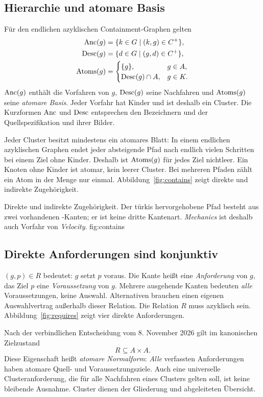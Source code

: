 \subsection{Hierarchie und atomare Basis}
Für den endlichen azyklischen Containment-Graphen gelten
\begin{align}
 \operatorname{Anc}(g)&=\{k\in G\mid(k,g)\in C^+\},\\
 \operatorname{Desc}(g)&=\{d\in G\mid(g,d)\in C^+\},\\
 \operatorname{Atoms}(g)&=\begin{cases}\{g\},&g\in A,\\\operatorname{Desc}(g)\cap A,&g\in K.\end{cases}
\end{align}
$\operatorname{Anc}(g)$ enthält die Vorfahren von $g$, $\operatorname{Desc}(g)$ seine Nachfahren und
$\operatorname{Atoms}(g)$ seine \emph{atomare Basis}. Jeder Vorfahr hat Kinder und ist
deshalb ein Cluster. Die Kurzformen $\operatorname{Anc}$ und $\operatorname{Desc}$ entsprechen den
Bezeichnern  und  der Quellspezifikation
und ihrer Bilder.

Jeder Cluster besitzt mindestens ein atomares Blatt: In einem endlichen
azyklischen Graphen endet jeder absteigende Pfad nach endlich vielen
Schritten bei einem Ziel ohne Kinder. Deshalb ist
$\operatorname{Atoms}(g)$ für jedes Ziel nichtleer. Ein Knoten ohne Kinder ist atomar,
kein leerer Cluster. Bei mehreren Pfaden zählt ein Atom in der Menge nur einmal.
Abbildung~\ref{fig:contains} zeigt direkte und indirekte Zugehörigkeit.

{Direkte und indirekte Zugehörigkeit. Der türkis hervorgehobene Pfad besteht
aus zwei vorhandenen -Kanten; er ist keine dritte Kantenart.
\emph{Mechanics} ist deshalb auch Vorfahr von \emph{Velocity}.}
{fig:contains}

\subsection{Direkte Anforderungen sind konjunktiv}
$(g,p)\in R$ bedeutet: $g$ setzt $p$ voraus. Die Kante heißt eine
\emph{Anforderung} von $g$, das Ziel $p$ eine \emph{Voraussetzung} von $g$.
Mehrere ausgehende Kanten bedeuten \emph{alle} Voraussetzungen, keine
Auswahl. Alternativen brauchen einen eigenen Auswahlvertrag außerhalb dieser
Relation. Die Relation $R$ muss azyklisch sein.
Abbildung~\ref{fig:requires} zeigt vier direkte Anforderungen.

Nach der verbindlichen Entscheidung vom 8. November 2026 gilt im
kanonischen Zielzustand
\begin{equation}
 R\subseteq A\times A.
 \label{eq:atomic-target}
\end{equation}
Diese Eigenschaft heißt \emph{atomare Normalform}:
\emph{Alle} verfassten Anforderungen haben atomare Quell- und
Voraussetzungsziele. Auch eine universelle Clusteranforderung, die für
alle Nachfahren eines Clusters gelten soll, ist keine bleibende Ausnahme.
Cluster dienen der Gliederung und abgeleiteten Übersicht.


